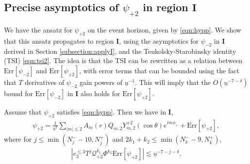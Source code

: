 \documentclass[reqno]{amsart}
\numberwithin{equation}{section}
\newcommand{\mcq}{\mathcal{Q}}
\newcommand{\ubar}{{\underline{u}}}
\newcommand{\errp}{\mathrm{Err}[\Psip]}
\newcommand{\errm}{\mathrm{Err}[\Psim]}
\newcommand{\un}{\mathbf{I}}
\newcommand{\Psip}{\psi_{+2}}
\newcommand{\psip}{\psi_{+2}}
\newcommand{\Psim}{\psi_{-2}}
\newcommand{\psim}{\psi_{-2}}
\newcommand{\sfrak}{2}
\newcommand{\ansatzp}{\frac{1}{\ubar^{7}}\sum_{|m|\leq2}A_m(r)Q_{m,\sfrak}Y_{m,\sfrak}^{+\sfrak}(\cos\theta)e^{im\phi_{+}}}
\theoremstyle{plain}
\theoremstyle{definition}
\theoremstyle{remark}
\numberwithin{equation}{section}
\begin{document}
\subsection{Precise asymptotics of $\psi_{+2}$ in region $\mathbf{I}$}\label{subsection:usetsi}
We have the ansatz for $\psip$ on the event horizon, given by \eqref{eqn:hypp}. We show that this ansatz propagates to region $\un$, using the asymptotics for $\psim$ in $\un$ derived in Section \ref{subsection:applyI}, and the Teukolsky-Starobinsky identity (TSI) \eqref{eqn:tsi2}. The idea is that the TSI can be rewritten as a relation between $\errm$ and $\errp$, with error terms that can be bounded using the fact that $T$ derivatives of $\Psim$ gain powers of $\ubar^{-1}$. This will imply that the $O(\ubar^{-7-\delta})$ bound for $\errm$ in $\un$ also holds for $\errp$.
\begin{prop}\label{prop:ansatzIp}
    Assume that $\Psip$ satisfies \eqref{eqn:hypp}. Then we have in $\un$,
    \begin{align}\label{eqn:ansatzpI}
        \psip=\ansatzp+\errp,
    \end{align}
where for $j\leq \min(N_j^{-}-10,N_j^{+})$ and $2k_1+k_2\leq \min(N_k^{-}-9,N_k^+)$, 
\begin{align}\label{eqn:aprover}
    |e_3^{\leq 3}T^j\mcq_{+2}^{k_1}\Phi^{k_2}\errp|\lesssim\ubar^{-7-j-\delta}.
\end{align}
\end{prop}
\end{document}
